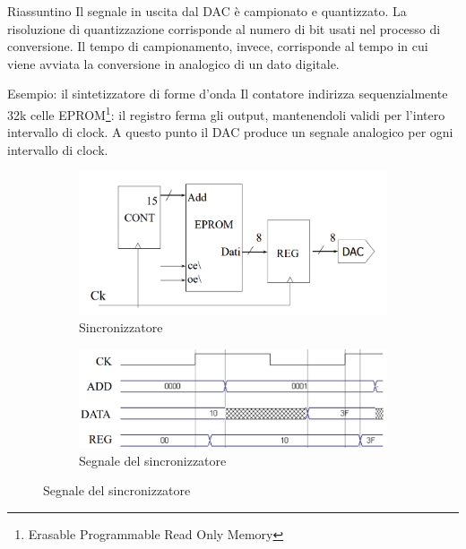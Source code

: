 \documentclass[
]{book}
\begin{document}
\begin{redbox}{Riassuntino}
Il segnale in uscita dal DAC è campionato e quantizzato. La risoluzione di quantizzazione corrisponde al numero di bit usati nel processo di conversione. Il tempo di campionamento, invece, corrisponde al tempo in cui viene avviata la conversione in analogico di un dato digitale.
\end{redbox}
\begin{bluebox}{Esempio: il sintetizzatore di forme d'onda}
    Il contatore indirizza sequenzialmente 32k celle EPROM\footnote{Erasable Programmable Read Only Memory}: il registro ferma gli output, mantenendoli validi per l'intero intervallo di clock. A questo punto il DAC produce un segnale analogico per ogni intervallo di clock.
\end{bluebox}

\begin{figure}[H]
        \begin{subfigure}[b]{0.45\textwidth}
            \centering
            \includegraphics[width=\textwidth]{assets/imgs/synth.png}
            \caption{Sincronizzatore}
        \end{subfigure}%
        \hfill
        \begin{subfigure}[b]{0.45\textwidth}
            \centering
            \includegraphics[width=\textwidth]{assets/imgs/synth_signal.png} 
            \caption{Segnale del sincronizzatore}
        \end{subfigure}
    \end{figure}
\end{document}
